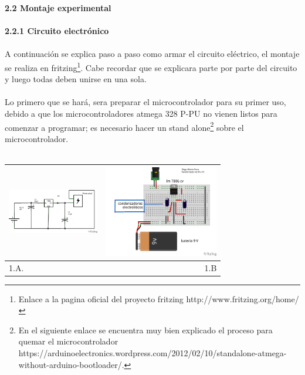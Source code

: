 \documentclass[12]{article}
\newenvironment{Figure}
{\par\medskip\noindent\minipage{\linewidth}}
{\endminipage\par\medskip}
\begin{document}
\begin{multicols}{2}
{\bf{2.2 Montaje experimental}}\\\\
{\bf{2.2.1 Circuito electrónico}}\\\\
A continuación se explica paso a paso como armar el circuito eléctrico, el montaje se realiza en fritzing\footnote{Enlace a la pagina oficial del proyecto fritzing http://www.fritzing.org/home/}. Cabe recordar que se explicara parte por parte del circuito y luego todas deben unirse en una sola.\\\\
Lo primero que se hará, sera preparar el microcontrolador para su primer uso, debido a que los microcontroladores atmega 328 P-PU no vienen listos para comenzar a programar; es necesario hacer un stand alone\footnote{En el siguiente enlace se encuentra muy bien explicado el proceso para quemar el microcontrolador https://arduinoelectronics.wordpress.com/2012/02/10/standalone-atmega-without-arduino-bootloader/.} sobre el microcontrolador.\\\\


\begin{Figure}
\center
\begin{tabular}{|l|r|}
\hline
\includegraphics[width=4cm, height=4cm]{img/esquematrans.png}  & \includegraphics[width=4.cm, height=4cm]{img/montajetr5V.png} \\ \hline
1.A. & 1.B \\ \hline
\end{tabular}
\label{fig:g1}
\end{Figure}
\vspace{0.2cm}


\end{multicols}
\end{document}
